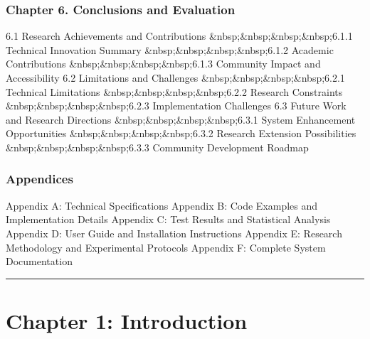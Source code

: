 \documentclass[12pt,a4paper]{report}
\begin{document}
\subsubsection{Chapter 6. Conclusions and Evaluation}

6.1 Research Achievements and Contributions  
\&nbsp;\&nbsp;\&nbsp;\&nbsp;6.1.1 Technical Innovation Summary  
\&nbsp;\&nbsp;\&nbsp;\&nbsp;6.1.2 Academic Contributions  
\&nbsp;\&nbsp;\&nbsp;\&nbsp;6.1.3 Community Impact and Accessibility  
6.2 Limitations and Challenges  
\&nbsp;\&nbsp;\&nbsp;\&nbsp;6.2.1 Technical Limitations  
\&nbsp;\&nbsp;\&nbsp;\&nbsp;6.2.2 Research Constraints  
\&nbsp;\&nbsp;\&nbsp;\&nbsp;6.2.3 Implementation Challenges  
6.3 Future Work and Research Directions  
\&nbsp;\&nbsp;\&nbsp;\&nbsp;6.3.1 System Enhancement Opportunities  
\&nbsp;\&nbsp;\&nbsp;\&nbsp;6.3.2 Research Extension Possibilities  
\&nbsp;\&nbsp;\&nbsp;\&nbsp;6.3.3 Community Development Roadmap

\subsubsection{Appendices}

Appendix A: Technical Specifications  
Appendix B: Code Examples and Implementation Details  
Appendix C: Test Results and Statistical Analysis  
Appendix D: User Guide and Installation Instructions  
Appendix E: Research Methodology and Experimental Protocols  
Appendix F: Complete System Documentation

\hrule

\section{Chapter 1: Introduction}
\end{document}
